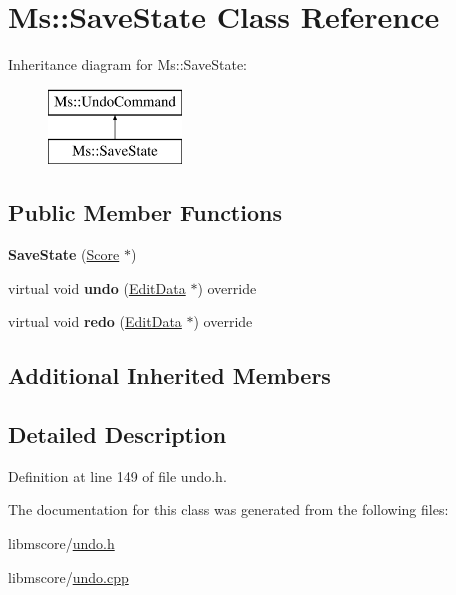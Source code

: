 \hypertarget{class_ms_1_1_save_state}{}\section{Ms\+:\+:Save\+State Class Reference}
\label{class_ms_1_1_save_state}
Inheritance diagram for Ms\+:\+:Save\+State\+:\begin{figure}[H]
\begin{center}
\leavevmode
\includegraphics[height=2.000000cm]{class_ms_1_1_save_state}
\end{center}
\end{figure}
\subsection*{Public Member Functions}
\begin{DoxyCompactItemize}
\item 
\mbox{\label{class_ms_1_1_save_state_acf12d1014c7b638720e16713fe7553a4}} 
{\bfseries Save\+State} (\hyperlink{class_ms_1_1_score}{Score} $\ast$)
\item 
\mbox{\label{class_ms_1_1_save_state_a906ace9f0e0a9b5efeb5d99c46c5c67e}} 
virtual void {\bfseries undo} (\hyperlink{class_ms_1_1_edit_data}{Edit\+Data} $\ast$) override
\item 
\mbox{\label{class_ms_1_1_save_state_aea2bfc688240a997cb9e4f2c88cb1982}} 
virtual void {\bfseries redo} (\hyperlink{class_ms_1_1_edit_data}{Edit\+Data} $\ast$) override
\end{DoxyCompactItemize}
\subsection*{Additional Inherited Members}


\subsection{Detailed Description}


Definition at line 149 of file undo.\+h.



The documentation for this class was generated from the following files\+:\begin{DoxyCompactItemize}
\item 
libmscore/\hyperlink{undo_8h}{undo.\+h}\item 
libmscore/\hyperlink{undo_8cpp}{undo.\+cpp}\end{DoxyCompactItemize}
